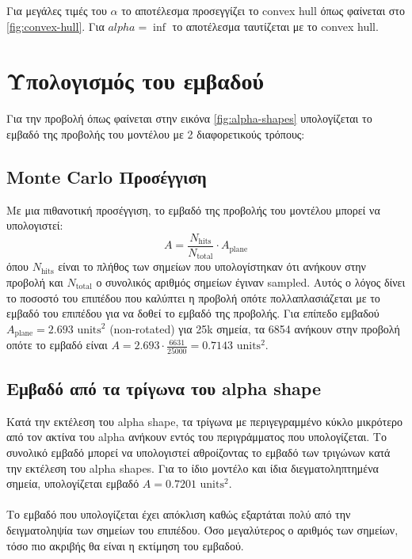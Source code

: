 \documentclass{report}
\begin{document}
 \label{fig:alpha-shapes}

 \label{fig:convex-hull}

Για μεγάλες τιμές του $\alpha$ το αποτέλεσμα προσεγγίζει το convex hull όπως φαίνεται στο \ref{fig:convex-hull}. Για
$alpha = \inf$ το αποτέλεσμα ταυτίζεται με το convex hull.


\section{Υπολογισμός του εμβαδού}
Για την προβολή όπως φαίνεται στην εικόνα \ref{fig:alpha-shapes} υπολογίζεται το εμβαδό της προβολής του μοντέλου 
με 2 διαφορετικούς τρόπους:
\subsection{Monte Carlo Προσέγγιση}
Με μια πιθανοτική προσέγγιση, το εμβαδό της προβολής του μοντέλου μπορεί να υπολογιστεί:
\begin{equation}
    A = \frac{N_{\text{hits}}}{N_{\text{total}}} \cdot A_{\text{plane}}
\end{equation}
όπου $N_{\text{hits}}$ είναι το πλήθος των σημείων που υπολογίστηκαν ότι ανήκουν στην προβολή και $N_{\text{total}}$
ο συνολικός αριθμός σημείων έγιναν sampled. Αυτός ο λόγος δίνει το ποσοστό του επιπέδου που καλύπτει η προβολή
οπότε πολλαπλασιάζεται με το εμβαδό του επιπέδου για να δοθεί το εμβαδό της προβολής.
Για επίπεδο εμβαδού $A_{\text{plane}} = 2.693 \text{ units}^2$ (non-rotated) για 25k σημεία, 
τα 6854 ανήκουν στην προβολή οπότε το εμβαδό είναι $A = 2.693 \cdot \frac{6631}{25000} = 0.7143 \text{ units}^2$.

\subsection{Εμβαδό από τα τρίγωνα του alpha shape}
Κατά την εκτέλεση του alpha shape, τα τρίγωνα με περιγεγραμμένο κύκλο μικρότερο από τον ακτίνα του alpha ανήκουν εντός
του περιγράμματος που υπολογίζεται. Το συνολικό εμβαδό μπορεί να υπολογιστεί αθροίζοντας το εμβαδό των τριγώνων
κατά την εκτέλεση του alpha shapes. Για το ίδιο μοντέλο και ίδια διεγματοληπτημένα σημεία, υπολογίζεται εμβαδό
$A = 0.7201 \text{ units}^2$.
\\\\
Το εμβαδό που υπολογίζεται έχει απόκλιση καθώς εξαρτάται πολύ από την δειγματοληψία των σημείων του επιπέδου.
Όσο μεγαλύτερος ο αριθμός των σημείων, τόσο πιο ακριβής θα είναι η εκτίμηση του εμβαδού.
\end{document}
